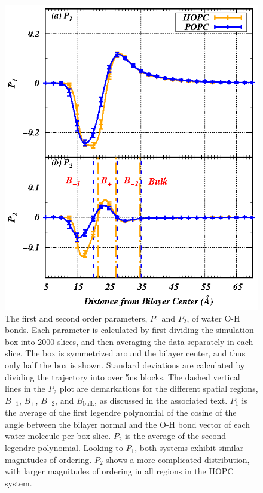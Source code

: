 \documentclass[12pt,preprint,times,openany,draft]{book}
\begin{document}
\begin{figure}
\caption{ 
The first and second order parameters, $P_1$ and $P_2$, of water O-H bonds. Each parameter is calculated by first dividing the simulation box into 2000 slices, 
and then averaging the data separately in each slice. The box is symmetrized around the bilayer center, and thus only half the box is shown. Standard deviations are calculated by dividing 
the trajectory into over 5ns blocks. The dashed vertical lines in the $P_2$ 
plot are demarkations for the different spatial regions, $B_{-1}$, $B_{+}$, $B_{-2}$, and $B_\text{bulk}$, as discussed in the associated text.
$P_1$ is the average of the first legendre polynomial of the cosine of the angle between the bilayer normal and the O-H bond vector of each water molecule per box slice. 
$P_2$ is the average of the second legendre polynomial.
Looking to $P_1$, both systems exhibit similar magnitudes of ordering. $P_2$ shows a more complicated distribution, with larger magnitudes of ordering in all regions in the HOPC system.}
\label{fig:h2order}
\includegraphics[width=	\textwidth]{h2order.eps}
\end{figure}
\end{document}
